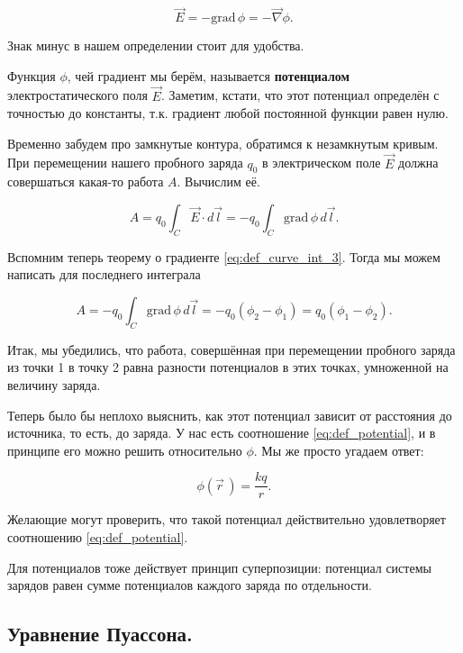 \documentclass[12pt,a4paper]{article}
\numberwithin{equation}{section}
\numberwithin{equation}{section}
\newcommand{\grad}{\mathrm{grad}\,}
\newcommand{\vn}{\vec{\nabla}}
\begin{document}
\begin{equation}
  \label{eq:def_potential}
  \vec{E}  = -\grad \phi = -\vn \phi.
\end{equation}

Знак минус в нашем определении стоит для удобства.

Функция $\phi$, чей градиент мы берём, называется \textbf{потенциалом}
электростатического поля $\vec{E}$. Заметим, кстати, что этот
потенциал определён с точностью до константы, т.к. градиент любой
постоянной функции равен нулю. 

Временно забудем про замкнутые контура, обратимся к незамкнутым
кривым. При перемещении нашего пробного заряда $q_0$ в электрическом поле
$\vec{E}$ должна совершаться какая-то работа $A$. Вычислим её. 

\begin{equation}
  \label{eq:work_statics_1}
  A = q_0 \int_C \vec{E} \cdot d\vec{l} = -q_0 \int_C \grad \phi\, d\vec{l}.
\end{equation}

Вспомним теперь теорему о градиенте \eqref{eq:def_curve_int_3}. Тогда
мы можем написать для последнего интеграла

\begin{equation}
  \label{eq:work_statics_2}
  A = -q_0 \int_C \grad \phi\, d\vec{l} = -q_0 (\phi_2 - \phi_1) = q_0
  (\phi_1 - \phi_2). 
\end{equation}

Итак, мы убедились, что работа, совершённая при перемещении пробного
заряда из точки 1 в точку 2 равна разности потенциалов в этих точках,
умноженной на величину заряда. 

Теперь было бы неплохо выяснить, как этот потенциал зависит от
расстояния до источника, то есть, до заряда. У нас есть соотношение
\eqref{eq:def_potential}, и в принципе его можно решить относительно
$\phi$. Мы же просто угадаем ответ:

\begin{equation}
  \label{eq:potential_r}
  \phi(\vec{r}\,) = \frac{kq}{r}. 
\end{equation}

Желающие могут проверить, что такой потенциал действительно
удовлетворяет соотношению \eqref{eq:def_potential}. 

Для потенциалов тоже действует принцип суперпозиции: потенциал системы
зарядов равен сумме потенциалов каждого заряда по отдельности. 

\subsection{Уравнение Пуассона.}
\label{sec:statics_div}
\end{document}
